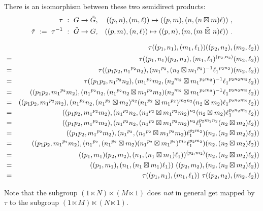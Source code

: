 \begin{prop} \label{prop:tau}
There is an isomorphism between these two semidirect products: 
\begin{eqnarray}
\label{eq:cat1-iso}
\tau ~:~ G \to \tilde{G}, &&
((p,n),(m,\ell)) \mapsto ((p,m),(n,(n \boxtimes m)\ell))~, \\
\nonumber
\tilde{\tau} ~:=~ \tau^{-1} ~:~ \tilde{G} \to G, &&
((p,m),(n,\ell)) \mapsto ((p,n),(m,(m \ \tilde{\boxtimes}\  n) \ell))~.
\end{eqnarray}
\end{prop}
\begin{pf}
\vspace{-6mm}
\begin{eqnarray*}
 &   &  \tau((p_1,n_1),(m_1,\ell_1))((p_2,n_2),(m_2,\ell_2)) \\
 & = &  \tau((p_1,n_1)(p_2,n_2),
                  (m_1,\ell_1)^{(p_2,n_2)}(m_2,\ell_2)) \\
 & = &  \tau((p_1p_2,{n_1}^{p_2}n_2),
    ({m_1}^{p_2},(n_2 \bt {m_1}^{p_2})^{-1} {\ell_1}^{p_2n_2})(m_2,\ell_2)) \\
 & = &  \tau((p_1p_2,{n_1}^{p_2}n_2),
                  ({m_1}^{p_2}m_2,({n_2}^{m_2} \bt {m_1}^{p_2m_2})^{-1}  
                    {\ell_1}^{p_2n_2m_2} \ell_2)) \\
 & = &  ((p_1p_2,{m_1}^{p_2}m_2),
         ({n_1}^{p_2}n_2,({n_1}^{p_2}n_2 \bt {m_1}^{p_2}m_2)
         ({n_2}^{m_2} \bt {m_1}^{p_2m_2})^{-1} 
                    {\ell_1}^{p_2n_2m_2} \ell_2)) \\ 
 & = &  ((p_1p_2,{m_1}^{p_2}m_2), 
         ({n_1}^{p_2}n_2, ({n_1}^{p_2} \bt m_2)^{n_2} 
         ({n_1}^{p_2} \bt {m_1}^{p_2})^{m_2n_2} 
         (n_2 \bt m_2) {\ell_1}^{p_2n_2m_2} \ell_2)) \\ 
 & = &  ((p_1p_2,{m_1}^{p_2}m_2), 
         ({n_1}^{p_2}n_2, ({n_1}^{p_2} \bt {m_1}^{p_2}m_2)^{n_2} 
         (n_2 \bt m_2) \ell_1^{p_2n_2m_2} \ell_2)) \\  
 & = &  ((p_1p_2,{m_1}^{p_2}m_2), 
         ({n_1}^{p_2}n_2, ({n_1}^{p_2} \bt {m_1}^{p_2}m_2)^{n_2} 
         \ell_1^{p_2m_2n_2} (n_2 \bt m_2) \ell_2)) \\  
 & = &  ((p_1p_2,{m_1}^{p_2}m_2), 
         ({n_1}^{p_2}, ({n_1}^{p_2} \bt {m_1}^{p_2}m_2) \ell_1^{p_2m_2}) 
         (n_2, (n_2 \bt m_2) \ell_2)) \\  
 & = &  ((p_1p_2,{m_1}^{p_2}m_2), 
         ({n_1}^{p_2}, ({n_1}^{p_2} \bt {m_2})
         ({n_1}^{p_2} \bt {m_1}^{p_2})^{m_2} \ell_1^{p_2m_2}) 
         (n_2, (n_2 \bt m_2) \ell_2)) \\  
 & = &  ((p_1,m_1)(p_2,m_2), 
        (n_1,(n_1 \bt m_1)\ell_1))^{(p_2,m_2)} (n_2,(n_2 \bt m_2)\ell_2)) \\
 & = &  ((p_1,m_1),(n_1,(n_1 \bt m_1)\ell_1)) 
        \ ((p_2,m_2),(n_2,(n_2 \bt m_2)\ell_2)) \\ 
 & = &  \tau((p_1,n_1),(m_1,\ell_1))\ \tau((p_2,n_2),(m_2,\ell_2))
\end{eqnarray*}
\end{pf}

\noindent
Note that the subgroup 
$(1 \ltimes N) \ltimes (M \ltimes 1)$
does \emph{not} in general get mapped by $\tau$ to the subgroup 
$(1 \ltimes M) \ltimes (N \ltimes 1)$. 
